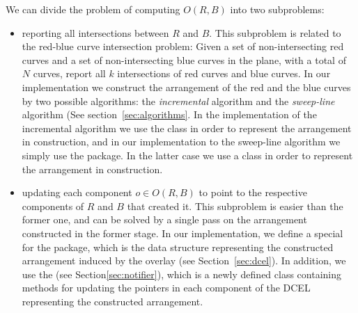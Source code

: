 We can divide the problem of computing $O(R,B)$ into two subproblems:
\begin{itemize}
\item reporting all intersections between $R$ and $B$.
This subproblem is related to the red-blue curve intersection 
problem: Given a set of non-intersecting red curves and a 
set of non-intersecting blue curves in the plane, 
with a total of $N$ curves, report all $k$ intersections of 
red curves and blue curves.
In our implementation we construct the arrangement of the 
red and the blue curves by two possible algorithms:
the {\it incremental} algorithm and the {\it sweep-line} 
algorithm (See section~\ref{sec:algorithms}. 
In the implementation of the incremental algorithm 
we use the  class 
in order to represent the arrangement in construction,
and in our implementation to the sweep-line algorithm 
we simply use the  package.
In the latter case we use a  class
in order to represent the arrangement in construction.

\item updating each component $o \in O(R,B)$ to point to the 
respective components of $R$ and $B$ that created it.
This subproblem is easier than the former one,
and can be solved by a single pass on the arrangement 
constructed in the former stage.
In our implementation, we define a special 
for the  package,
which is the data structure representing the constructed arrangement 
induced by the overlay (see Section~\ref{sec:dcel}).
In addition, we use the  
(see Section\ref{sec:notifier}), which is 
a newly defined class containing methods for updating the pointers 
in each component of the DCEL representing the 
constructed arrangement.
\end{itemize}

